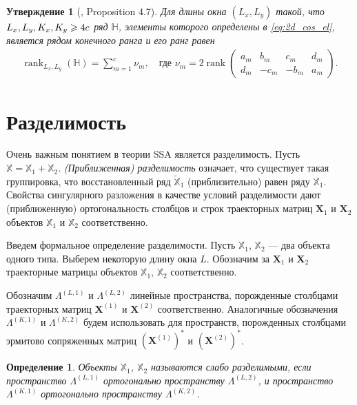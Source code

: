 \documentclass[specialist,
               substylefile = spbu.rtx,
               subf,href,colorlinks=true, 12pt]{disser}
\def\rank{\mathop{\mathrm{rank}}}
\newtheorem{defn}{Определение}
\newtheorem{Th}{Утверждение}
\begin{document}
\begin{Th}[\cite{Golyandina.Usevich2010}, Proposition 4.7] \label{th:2d_rank_cos}
Для длины окна $(L_x, L_y)$ такой, что $L_x, L_y, K_x, \\K_y \geqslant 4c$ ряд $\mathbb{H}$, элементы которого определены в \eqref{eq:2d_cos_el}, является рядом конечного ранга и его ранг равен 
\begin{gather*}
\rank_{L_x, L_y}(\mathbb{H}) = \sum_{m=1}^{c}{\nu_m}, \quad \text{где } \nu_m=2\rank
 \left(
  \begin{matrix} 
a_m &b_m &c_m &d_m \\
d_m &-c_m &-b_m &a_m
\end{matrix}
\right).
\end{gather*}  
\end{Th}

\section{Разделимость}
\label{sec:separability}
Очень важным понятием в теории SSA является разделимость. Пусть $\mathbb{X} = \mathbb{X}_1 + \mathbb{X}_2$. \textit{(Приближенная) разделимость} означает, что существует такая группировка, что восстановленный ряд $\widetilde{\mathbb{X}}_1$ (приблизительно) равен ряду $\mathbb{X}_1$. 
Свойства сингулярного разложения в качестве условий разделимости дают (приближенную) ортогональность столбцов и строк траекторных матриц $\mathbf{X}_1$  и  $\mathbf{X}_2$ объектов $\mathbb{X}_1$ и $\mathbb{X}_2$ соответственно.

Введем формальное определение разделимости. 
Пусть  $\mathbb{X}_1$,  $\mathbb{X}_2$ --- два объекта одного типа. Выберем некоторую длину окна $L$. Обозначим за $\mathbf{X}_1$  и  $\mathbf{X}_2$ траекторные матрицы объектов $\mathbb{X}_1$,  $\mathbb{X}_2$ соответственно. 

Обозначим  $\Lambda^{(L,1)}$  и $\Lambda^{(L,2)}$  линейные пространства, порожденные столбцами траекторных матриц   $\mathbf{X}^{(1)}$  и  $\mathbf{X}^{(2)}$  соответственно. Аналогичные обозначения  $\Lambda^{(K,1)}$  и $\Lambda^{(K,2)}$  будем использовать для пространств, порожденных столбцами эрмитово сопряженных матриц $(\mathbf{X}^{(1)})^\mathrm{*}$  и  $(\mathbf{X}^{(2)})^\mathrm{*}$.

\begin{defn}
Объекты $\mathbb{X}_1$,  $\mathbb{X}_2$ называются \emph{слабо разделимыми}, если пространство $\Lambda^{(L,1)}$ ортогонально пространству $\Lambda^{(L,2)}$, и пространство $\Lambda^{(K,1)}$  ортогонально пространству $\Lambda^{(K,2)}$.
\end{defn}
\end{document}
